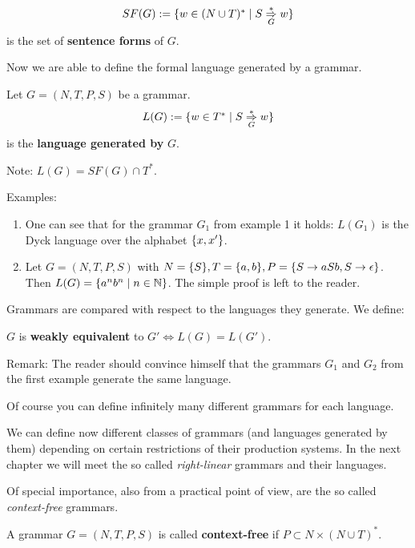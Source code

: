 \begin{definition}
\[ SF(G) := \mbox{$\{w \in (N \cup T)^* \mid S \underset{G}{\overset{*}{\Rightarrow}} w\}$} \] is the set of
{\bf sentence forms} of $G$.
\end{definition}

Now we are able to define the formal language generated by a grammar.

\begin{definition}
Let $G = (N, T, P, S)$ be a grammar. \[ L(G) := \mbox{$\{w \in T^* \mid S
\underset{G}{\overset{*}{\Rightarrow}} w\}$} \] is the {\bf language generated by} $G$.
\end{definition}

Note: $L(G) = SF(G) \cap T^*$.

Examples:
\begin{enumerate}
  \item One can see that for the grammar $G_1$ from example 1 it holds: $L(G_1)$
  is the Dyck language over the alphabet $\mbox{$\{x, x'\}$}$.
  \item Let $G = (N, T, P, S)$ with $N = \mbox{$\{S\}$}, T = \mbox{$\{a, b\}$}, P =
  \mbox{$\{S \to aSb, S \to \epsilon\}$}$. Then $L(G) = \mbox{$\{a^n b^n \mid n \in
  \mathbb{N}\}$}$. The simple proof is left to the reader.
\end{enumerate}

Grammars are compared with respect to the languages they generate. We define:

\begin{definition}
$G$ is {\bf weakly equivalent} to $G' \iff L(G) = L(G')$.
\end{definition}

Remark: The reader should convince himself that the grammars $G_1$ and $G_2$
from the first example generate the same language.

Of course you can define infinitely many different grammars for each language.

We can define now different classes of grammars (and languages generated by
them) depending on certain restrictions of their production systems. In the next
chapter we will meet the so called {\em right-linear} grammars and their
languages.

Of special importance, also from a practical point of view, are the so
called {\em context-free} grammars.

\begin{definition}
A grammar $G = (N, T, P, S)$ is called {\bf context-free} if $P \subset N \times
(N \cup T)^*$.
\end{definition}

